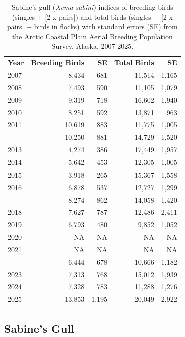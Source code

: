 \documentclass[
]{article}
\begin{document}
\begin{longtable}[t]{lrrrr}

\caption{\label{tbl-SAGU}Sabine's gull (\emph{Xema sabini}) indices of
breeding birds (singles + {[}2 x pairs{]}) and total birds (singles +
{[}2 x pairs{]} + birds in flocks) with standard errors (SE) from the
Arctic Coastal Plain Aerial Breeding Population Survey, Alaska,
2007-2025.}

\tabularnewline

\\
\toprule
\textbf{Year} & \textbf{Breeding Birds} & \textbf{SE} & \textbf{Total Birds} & \textbf{SE}\\
\midrule
2007 & 8,434 & 681 & 11,514 & 1,165\\
2008 & 7,493 & 590 & 11,105 & 1,079\\
2009 & 9,319 & 718 & 16,602 & 1,940\\
2010 & 8,251 & 592 & 13,871 & 963\\
2011 & 10,619 & 883 & 11,775 & 1,005\\
\addlinespace
2012 & 10,250 & 881 & 14,729 & 1,520\\
2013 & 4,274 & 386 & 17,449 & 1,957\\
2014 & 5,642 & 453 & 12,305 & 1,005\\
2015 & 3,918 & 265 & 15,367 & 1,558\\
2016 & 6,878 & 537 & 12,727 & 1,299\\
\addlinespace
2017 & 8,274 & 862 & 14,058 & 1,420\\
2018 & 7,627 & 787 & 12,486 & 2,411\\
2019 & 6,793 & 480 & 9,852 & 1,052\\
2020 & NA & NA & NA & NA\\
2021 & NA & NA & NA & NA\\
\addlinespace
2022 & 6,444 & 678 & 10,666 & 1,182\\
2023 & 7,313 & 768 & 15,012 & 1,939\\
2024 & 7,328 & 783 & 11,288 & 1,276\\
2025 & 13,853 & 1,195 & 20,049 & 2,922\\
\bottomrule

\end{longtable}

\endgroup{}

\newpage{}

\subsection*{Sabine's Gull}\label{sabines-gull-2}
\end{document}
